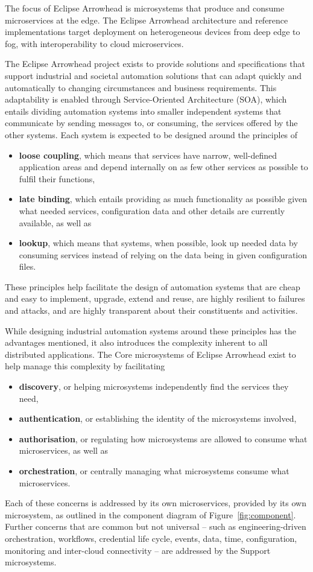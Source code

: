 \documentclass[a4paper]{arrowhead}
\begin{document}
The focus of Eclipse Arrowhead is microsystems that produce and consume microservices at the
edge. The Eclipse Arrowhead architecture and reference implementations target deployment on
heterogeneous devices from deep edge to fog, with interoperability to cloud microservices.

The Eclipse Arrowhead project exists to provide solutions and specifications that support
industrial and societal automation solutions that can adapt quickly and automatically to
changing circumstances and business requirements. This adaptability is enabled through
Service-Oriented Architecture (SOA), which entails dividing automation systems into smaller
independent systems that communicate by sending messages to, or consuming, the services
offered by the other systems. Each system is expected to be designed around the principles of
\begin{itemize}
  \item \textbf{loose coupling}, which means that services have narrow, well-defined application
        areas and depend internally on as few other services as possible to fulfil their
        functions,
  \item \textbf{late binding}, which entails providing as much functionality as possible given
        what needed services, configuration data and other details are currently available, as
        well as
  \item \textbf{lookup}, which means that systems, when possible, look up needed data by
        consuming services instead of relying on the data being in given configuration files.
\end{itemize}
These principles help facilitate the design of automation systems that are cheap and easy to
implement, upgrade, extend and reuse, are highly resilient to failures and attacks, and are
highly transparent about their constituents and activities.

While designing industrial automation systems around these principles has the advantages
mentioned, it also introduces the complexity inherent to all distributed applications. The
Core microsystems of Eclipse Arrowhead exist to help manage this complexity by facilitating
\begin{itemize}
  \item \textbf{discovery}, or helping microsystems independently find the services they need,
  \item \textbf{authentication}, or establishing the identity of the microsystems involved,
  \item \textbf{authorisation}, or regulating how microsystems are allowed to consume what
        microservices, as well as
  \item \textbf{orchestration}, or centrally managing what microsystems consume what
        microservices.
\end{itemize}
Each of these concerns is addressed by its own microservices, provided by its own microsystem,
as outlined in the component diagram of Figure~\ref{fig:component}. Further concerns that are common
but not universal -- such as engineering-driven orchestration, workflows, credential life cycle,
events, data, time, configuration, monitoring and inter-cloud connectivity -- are addressed by the
Support microsystems.
\end{document}
